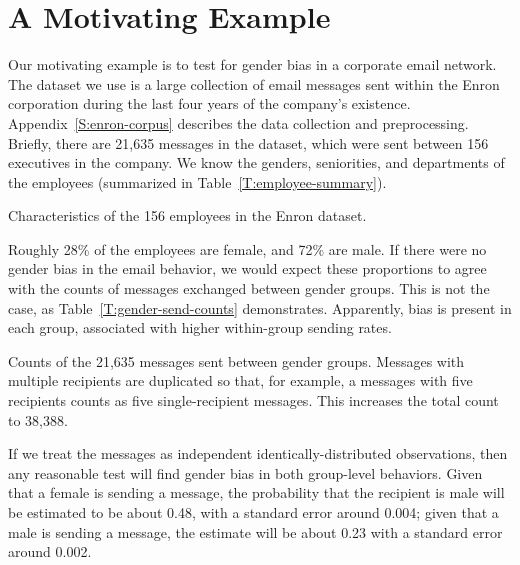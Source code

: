 \documentclass[aoas,preprint]{imsart}
\begin{document}
\section{A Motivating Example}\label{S:motivating-example}

Our motivating example is to test for gender bias in a corporate email
network.  The dataset we use is a large collection of email messages sent
within the Enron corporation during the last four years of the company's
existence.  Appendix~\ref{S:enron-corpus} describes the data collection and
preprocessing.  Briefly, there are 21,635 messages in the dataset, which
were sent between 156 executives in the company.  We know the genders,
seniorities, and departments of the employees (summarized in
Table~\ref{T:employee-summary}).

\begin{table}[h]
    
    \caption{
        Characteristics of the 156 employees in the Enron dataset.
    }
    \label{T:employee-summary}
\end{table}

Roughly 28\% of the employees are female, and 72\% are male.  If there were
no gender bias in the email behavior, we would expect these proportions to
agree with the counts of messages exchanged between gender groups.  This
is not the case, as Table~\ref{T:gender-send-counts} demonstrates.  
Apparently, bias is present in each group, associated with higher
within-group sending rates.

\begin{table}[h]
    
    \caption{
        Counts of the 21,635 messages sent between gender groups.  Messages
        with multiple recipients are duplicated so that, for example,
        a messages with five recipients counts as five single-recipient
        messages.  This increases the total count to 38,388.
    }
    \label{T:gender-send-counts}
\end{table}

If we treat the messages as independent identically-distributed observations,
then any reasonable test will find gender bias in both group-level behaviors.
Given that a female is sending a message, the probability that the recipient
is male will be estimated to be about 0.48, with a standard error around
0.004; given that a male is sending a message, the estimate will be about
0.23 with a standard error around 0.002.
\end{document}
